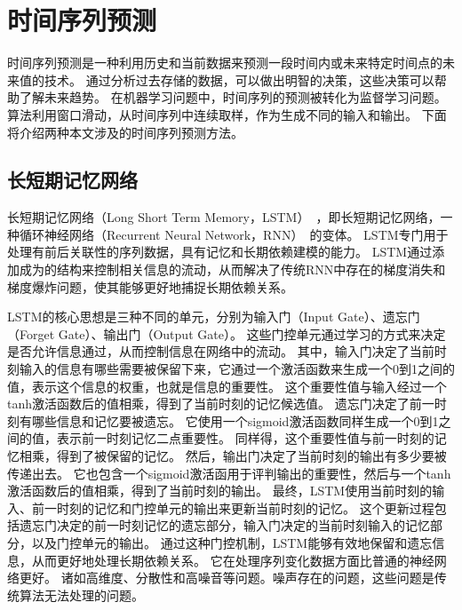 


\section{时间序列预测}
时间序列预测是一种利用历史和当前数据来预测一段时间内或未来特定时间点的未来值的技术。 
通过分析过去存储的数据，可以做出明智的决策，这些决策可以帮助了解未来趋势。
在机器学习问题中，时间序列的预测被转化为监督学习问题。
算法利用窗口滑动，从时间序列中连续取样，作为生成不同的输入和输出。
下面将介绍两种本文涉及的时间序列预测方法。

\subsection{长短期记忆网络}
长短期记忆网络（Long Short Term Memory，LSTM）~\cite{hochreiter1997long}，即长短期记忆网络，一种循环神经网络（Recurrent Neural Network，RNN）~\cite{rnn}的变体。
LSTM专门用于处理有前后关联性的序列数据，具有记忆和长期依赖建模的能力。
LSTM通过添加成为的结构来控制相关信息的流动，从而解决了传统RNN中存在的梯度消失和梯度爆炸问题，使其能够更好地捕捉长期依赖关系。

LSTM的核心思想是三种不同的单元，分别为输入门（Input Gate）、遗忘门（Forget Gate）、输出门（Output Gate）。
这些门控单元通过学习的方式来决定是否允许信息通过，从而控制信息在网络中的流动。
其中，输入门决定了当前时刻输入的信息有哪些需要被保留下来，它通过一个激活函数来生成一个0到1之间的值，表示这个信息的权重，也就是信息的重要性。
这个重要性值与输入经过一个tanh激活函数后的值相乘，得到了当前时刻的记忆候选值。
遗忘门决定了前一时刻有哪些信息和记忆要被遗忘。
它使用一个sigmoid激活函数同样生成一个0到1之间的值，表示前一时刻记忆二点重要性。
同样得，这个重要性值与前一时刻的记忆相乘，得到了被保留的记忆。
然后，输出门决定了当前时刻的输出有多少要被传递出去。
它也包含一个sigmoid激活函用于评判输出的重要性，然后与一个tanh激活函数后的值相乘，得到了当前时刻的输出。
最终，LSTM使用当前时刻的输入、前一时刻的记忆和门控单元的输出来更新当前时刻的记忆。
这个更新过程包括遗忘门决定的前一时刻记忆的遗忘部分，输入门决定的当前时刻输入的记忆部分，以及门控单元的输出。
通过这种门控机制，LSTM能够有效地保留和遗忘信息，从而更好地处理长期依赖关系。
它在处理序列变化数据方面比普通的神经网络更好。
诸如高维度、分散性和高噪音等问题。噪声存在的问题，这些问题是传统算法无法处理的问题。


